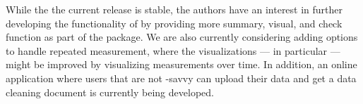 \documentclass[article,shortnames]{jss}
\begin{document}
While the the current release is stable, the authors have an interest
in further developing the functionality of  by providing
more summary, visual, and check function as part of the
package. We are also currently considering adding options to handle
repeated measurement, where the visualizations --- in particular ---
might be improved by visualizing measurements over time. In addition,
an online  \citep{shiny} application where users that are not
-savvy can upload their data and get a data cleaning
document is currently being developed.




% 



\appendix
\newpage

% 








\end{document}
